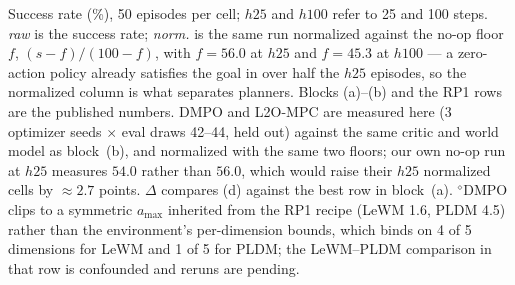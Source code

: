 \begin{table}[t]
  \vspace{3pt}
  {\footnotesize\setlength{\parindent}{0pt}\raggedright
  \indent Success rate (\%), 50 episodes per cell; $h25$ and $h100$ refer to 25
  and 100 steps. \emph{raw} is the success rate; \emph{norm.} is the same run
  normalized against the no-op floor $f$, $(s-f)/(100-f)$, with $f=56.0$ at
  $h25$ and $f=45.3$ at $h100$ --- a zero-action policy already satisfies the
  goal in over half the $h25$ episodes, so the normalized column is what
  separates planners. Blocks (a)--(b) and the RP1 rows are the published
  numbers. DMPO and L2O-MPC are measured here (3 optimizer seeds $\times$ eval
  draws 42--44, held out) against the same critic and world model as
  block~(b), and normalized with the same two floors; our own no-op run at
  $h25$ measures $54.0$ rather than $56.0$, which would raise their $h25$
  normalized cells by $\approx 2.7$ points. $\Delta$ compares (d) against the
  best row in block~(a).
  $^{\diamond}$DMPO clips to a symmetric $a_{\max}$ inherited from the RP1
  recipe (LeWM 1.6, PLDM 4.5) rather than the environment's per-dimension
  bounds, which binds on 4 of 5 dimensions for LeWM and 1 of 5 for PLDM; the
  LeWM--PLDM comparison in that row is confounded and reruns are pending.\par}
\end{table}

%
